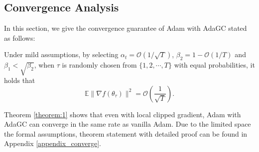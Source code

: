 \subsection{Convergence Analysis}
In this section, we give the convergence guarantee of Adam with AdaGC stated as follows:
\begin{theorem}
    \label{theorem:1}
    Under mild assumptions, by selecting $\alpha_t = \mathcal{O}(1/\sqrt{T})$, $\beta_2 = 1- \mathcal{O}(1/T)$ and $\beta_1 < \sqrt{\beta_2}$, 
    when $\tau$ is randomly chosen from $\{1,2,\cdots,T\}$ with equal probabilities, it holds that
    \[
    \mathbb{E} \|\nabla f(\theta_\tau)\|^2  = \mathcal{O}\left(\frac{1}{\sqrt{T}}\right).
    \]
\end{theorem}
Theorem \ref{theorem:1} shows that even with local clipped gradient, Adam with AdaGC can converge in the same rate as vanilla Adam. Due to the limited space the formal assumptions, theorem statement with detailed proof can be found in Appendix \ref{appendix_converge}.





